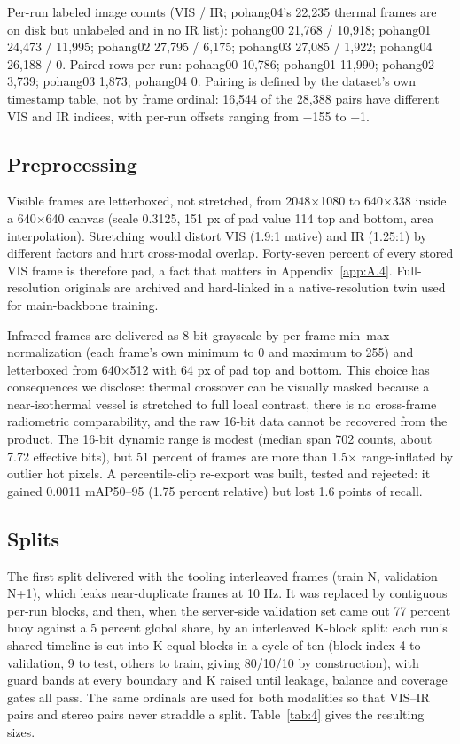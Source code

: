 \documentclass[journal,onecolumn]{IEEEtran}
\begin{document}
Per-run labeled image counts (VIS / IR; pohang04's 22,235 thermal frames are on disk but unlabeled and in no IR list): pohang00 21,768 / 10,918; pohang01 24,473 / 11,995; pohang02 27,795 / 6,175; pohang03 27,085 / 1,922; pohang04 26,188 / 0. Paired rows per run: pohang00 10,786; pohang01 11,990; pohang02 3,739; pohang03 1,873; pohang04 0. Pairing is defined by the dataset's own timestamp table, not by frame ordinal: 16,544 of the 28,388 pairs have different VIS and IR indices, with per-run offsets ranging from $-$155 to +1.

\subsection{Preprocessing}\label{app:A.2}
Visible frames are letterboxed, not stretched, from 2048$\times$1080 to 640$\times$338 inside a 640$\times$640 canvas (scale 0.3125, 151 px of pad value 114 top and bottom, area interpolation). Stretching would distort VIS (1.9:1 native) and IR (1.25:1) by different factors and hurt cross-modal overlap. Forty-seven percent of every stored VIS frame is therefore pad, a fact that matters in Appendix~\ref{app:A.4}. Full-resolution originals are archived and hard-linked in a native-resolution twin used for main-backbone training.

Infrared frames are delivered as 8-bit grayscale by per-frame min--max normalization (each frame's own minimum to 0 and maximum to 255) and letterboxed from 640$\times$512 with 64 px of pad top and bottom. This choice has consequences we disclose: thermal crossover can be visually masked because a near-isothermal vessel is stretched to full local contrast, there is no cross-frame radiometric comparability, and the raw 16-bit data cannot be recovered from the product. The 16-bit dynamic range is modest (median span 702 counts, about 7.72 effective bits), but 51 percent of frames are more than 1.5$\times$ range-inflated by outlier hot pixels. A percentile-clip re-export was built, tested and rejected: it gained 0.0011 mAP50--95 (1.75 percent relative) but lost 1.6 points of recall.

\subsection{Splits}\label{app:A.3}
The first split delivered with the tooling interleaved frames (train N, validation N+1), which leaks near-duplicate frames at 10 Hz. It was replaced by contiguous per-run blocks, and then, when the server-side validation set came out 77 percent buoy against a 5 percent global share, by an interleaved K-block split: each run's shared timeline is cut into K equal blocks in a cycle of ten (block index 4 to validation, 9 to test, others to train, giving 80/10/10 by construction), with guard bands at every boundary and K raised until leakage, balance and coverage gates all pass. The same ordinals are used for both modalities so that VIS--IR pairs and stereo pairs never straddle a split. Table~\ref{tab:4} gives the resulting sizes.
\end{document}
